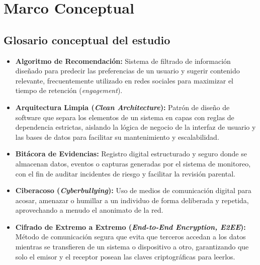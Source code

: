 \chapter[Marco Conceptual]{Marco Conceptual}
\label{ch:marco-conceptual}

\insertminitoc
\parindent0pt

\clearpage

\section{Glosario conceptual del estudio}

\begin{itemize}
    \item[] \textbf{Algoritmo de Recomendación:} Sistema de filtrado de información diseñado para predecir las preferencias de un usuario y sugerir contenido relevante, frecuentemente utilizado en redes sociales para maximizar el tiempo de retención (\textit{engagement}). \\
    
    \item[] \textbf{Arquitectura Limpia (\textit{Clean Architecture}):} Patrón de diseño de software que separa los elementos de un sistema en capas con reglas de dependencia estrictas, aislando la lógica de negocio de la interfaz de usuario y las bases de datos para facilitar su mantenimiento y escalabilidad. \\
    
    \item[] \textbf{Bitácora de Evidencias:} Registro digital estructurado y seguro donde se almacenan datos, eventos o capturas generadas por el sistema de monitoreo, con el fin de auditar incidentes de riesgo y facilitar la revisión parental. \\
    
    \item[] \textbf{Ciberacoso (\textit{Cyberbullying}):} Uso de medios de comunicación digital para acosar, amenazar o humillar a un individuo de forma deliberada y repetida, aprovechando a menudo el anonimato de la red. \\
    
    \item[] \textbf{Cifrado de Extremo a Extremo (\textit{End-to-End Encryption, E2EE}):} Método de comunicación segura que evita que terceros accedan a los datos mientras se transfieren de un sistema o dispositivo a otro, garantizando que solo el emisor y el receptor posean las claves criptográficas para leerlos. \\
    

\end{itemize}

